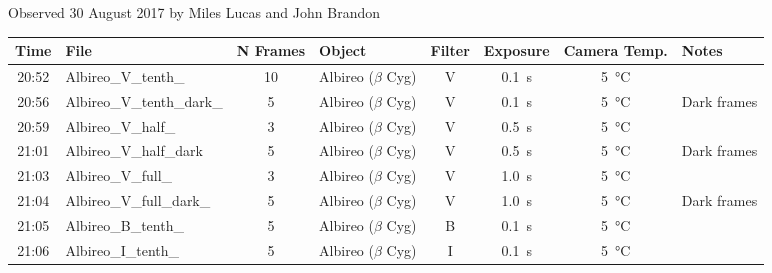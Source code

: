 \caption{Observed 30 August 2017 by Miles Lucas and John Brandon}
\begin{tabular}{clclcccl}
	\hline
	Time  & File                      & N Frames & Object                & Filter &     Exposure      &      Camera Temp.      & Notes       \\ \hline\hline
	20:52 & Albireo\_V\_tenth\_       &    10    & Albireo ($\beta$ Cyg) &   V    & \SI{0.1}{\second} & \SI{5}{\degreeCelsius} &             \\
	20:56 & Albireo\_V\_tenth\_dark\_ &    5     & Albireo ($\beta$ Cyg) &   V    & \SI{0.1}{\second} & \SI{5}{\degreeCelsius} & Dark frames \\
	20:59 & Albireo\_V\_half\_        &    3     & Albireo ($\beta$ Cyg) &   V    & \SI{0.5}{\second} & \SI{5}{\degreeCelsius} &             \\
	21:01 & Albireo\_V\_half\_dark    &    5     & Albireo ($\beta$ Cyg) &   V    & \SI{0.5}{\second} & \SI{5}{\degreeCelsius} & Dark frames \\
	21:03 & Albireo\_V\_full\_        &    3     & Albireo ($\beta$ Cyg) &   V    & \SI{1.0}{\second} & \SI{5}{\degreeCelsius} &             \\
	21:04 & Albireo\_V\_full\_dark\_  &    5     & Albireo ($\beta$ Cyg) &   V    & \SI{1.0}{\second} & \SI{5}{\degreeCelsius} & Dark frames \\
	21:05 & Albireo\_B\_tenth\_       &    5     & Albireo ($\beta$ Cyg) &   B    & \SI{0.1}{\second} & \SI{5}{\degreeCelsius} &             \\
	21:06 & Albireo\_I\_tenth\_       &    5     & Albireo ($\beta$ Cyg) &   I    & \SI{0.1}{\second} & \SI{5}{\degreeCelsius} &             \\ \hline
\end{tabular}